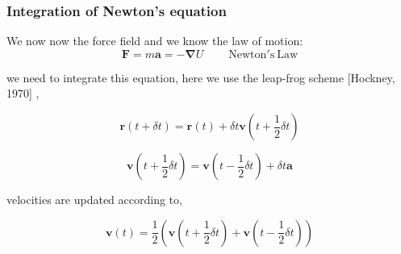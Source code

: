 \documentclass{beamer}
\begin{document}
\begin{frame}\frametitle{Integration of Newton's equation}

We now now the force field and we know the law of motion:
  \begin{equation}
	  \mathbf{F}= m \mathbf{a} = - \mathbf{\nabla} U      \mathrm{~~~~~~~~~~Newton's~ Law}
  \end{equation}

  we need to integrate this equation, here we use the leap-frog scheme [Hockney, 1970] ,

  \begin{equation}
	  \mathbf{r} (t+\delta t)= \mathbf{r} (t) + \delta t  \mathbf{v} (t+ \frac{1}{2} \delta t)
  \end{equation}

  \begin{equation}
	  \mathbf{v} (t+ \frac{1}{2}\delta t)= \mathbf{v} (t- \frac{1}{2} \delta t) + \delta t \mathbf{a}
  \end{equation}

velocities are updated according to, 

  \begin{equation}
	  \mathbf{v} (t)= \frac{1}{2} \left( \mathbf{v} (t+ \frac{1}{2} \delta t) + \mathbf{v} (t- \frac{1}{2} \delta t)  \right)
  \end{equation}

\end{frame}

%
%
%
%
%
%
\end{document}
